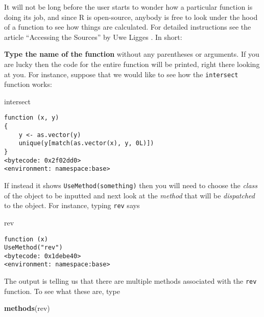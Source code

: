 \documentclass[]{book}
\newenvironment{Shaded}{\begin{snugshade}}{\end{snugshade}}
\newcommand{\KeywordTok}[1]{\textcolor[rgb]{0.13,0.29,0.53}{\textbf{{#1}}}}
\newcommand{\NormalTok}[1]{{#1}}
\numberwithin{equation}{chapter}
\numberwithin{figure}{chapter}
\theoremstyle{plain}
\theoremstyle{definition}
\theoremstyle{remark}
\theoremstyle{definition}
\theoremstyle{definition}
\theoremstyle{remark}
\begin{document}
It will not be long before the user starts to wonder how a particular
function is doing its job, and since R is open-source, anybody is free
to look under the hood of a function to see how things are calculated.
For detailed instructions see the article ``Accessing the Sources'' by
Uwe Ligges \autocite{Ligges2006}. In short:

\textbf{Type the name of the function} without any parentheses or
arguments. If you are lucky then the code for the entire function will
be printed, right there looking at you. For instance, suppose that we
would like to see how the \texttt{intersect}
 function works:

\begin{Shaded}
\begin{Highlighting}[]
\NormalTok{intersect}
\end{Highlighting}
\end{Shaded}

\begin{verbatim}
function (x, y) 
{
    y <- as.vector(y)
    unique(y[match(as.vector(x), y, 0L)])
}
<bytecode: 0x2f02dd0>
<environment: namespace:base>
\end{verbatim}

If instead it shows \texttt{UseMethod(something)}
 then you will need to choose the
\emph{class} of the object to be inputted and next look at the
\emph{method} that will be \emph{dispatched} to the object. For
instance, typing \texttt{rev}  says

\begin{Shaded}
\begin{Highlighting}[]
\NormalTok{rev}
\end{Highlighting}
\end{Shaded}

\begin{verbatim}
function (x) 
UseMethod("rev")
<bytecode: 0x1debe40>
<environment: namespace:base>
\end{verbatim}

The output is telling us that there are multiple methods associated with
the \texttt{rev} function. To see what these are, type

\begin{Shaded}
\begin{Highlighting}[]
\KeywordTok{methods}\NormalTok{(rev)}
\end{Highlighting}
\end{Shaded}
\end{document}
